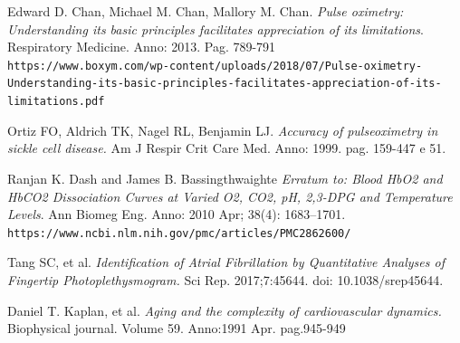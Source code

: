 \documentclass[12pt,a4paper, twoside, openright]{report}
\begin{document}
\begin{thebibliography}{1}
Edward D. Chan, Michael M. Chan, Mallory M. Chan. 
\textit{Pulse oximetry: Understanding its basic principles facilitates appreciation of its limitations}. 
Respiratory Medicine. Anno: 2013. Pag. 789-791
\\\texttt{https://www.boxym.com/wp-content/uploads/2018/07/Pulse-oximetry-Understanding-its-basic-principles-facilitates-appreciation-of-its-limitations.pdf}


Ortiz FO, Aldrich TK, Nagel RL, Benjamin LJ.
\textit{Accuracy of pulseoximetry in sickle cell disease.}
Am J Respir Crit Care Med. Anno: 1999. pag. 159-447 e 51.


Ranjan K. Dash and James B. Bassingthwaighte
\textit{Erratum to: Blood HbO2 and HbCO2 Dissociation Curves at Varied O2, CO2, pH, 2,3-DPG and Temperature Levels}.
Ann Biomeg Eng. Anno: 2010 Apr; 38(4): 1683–1701. 
\\\texttt{https://www.ncbi.nlm.nih.gov/pmc/articles/PMC2862600/}


Tang SC, et al. 
\textit{Identification of Atrial Fibrillation by Quantitative Analyses of Fingertip Photoplethysmogram.} Sci Rep. 2017;7:45644. doi: 10.1038/srep45644.


Daniel T. Kaplan, et al.
\textit{Aging and the complexity of cardiovascular dynamics.}
Biophysical journal. Volume 59. Anno:1991 Apr. pag.945-949



\end{thebibliography}
\end{document}
